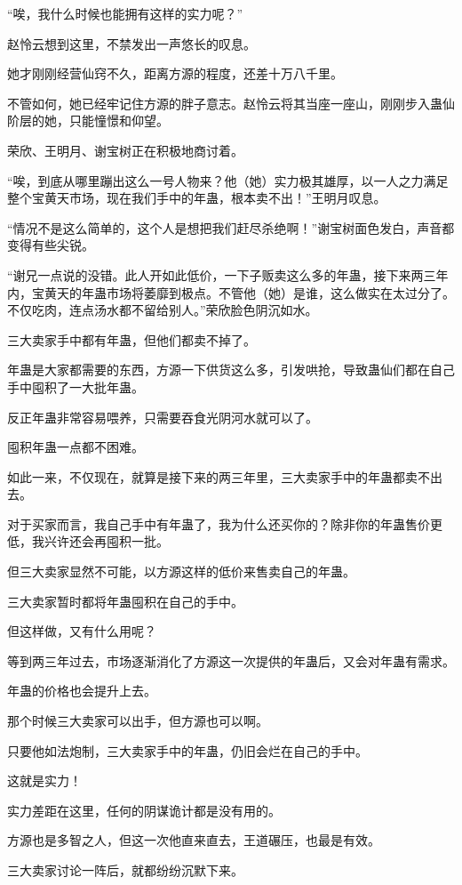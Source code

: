 \begin{this_body}
“唉，我什么时候也能拥有这样的实力呢？”

赵怜云想到这里，不禁发出一声悠长的叹息。

她才刚刚经营仙窍不久，距离方源的程度，还差十万八千里。

不管如何，她已经牢记住方源的胖子意志。赵怜云将其当座一座山，刚刚步入蛊仙阶层的她，只能憧憬和仰望。

荣欣、王明月、谢宝树正在积极地商讨着。

“唉，到底从哪里蹦出这么一号人物来？他（她）实力极其雄厚，以一人之力满足整个宝黄天市场，现在我们手中的年蛊，根本卖不出！”王明月叹息。

“情况不是这么简单的，这个人是想把我们赶尽杀绝啊！”谢宝树面色发白，声音都变得有些尖锐。

“谢兄一点说的没错。此人开如此低价，一下子贩卖这么多的年蛊，接下来两三年内，宝黄天的年蛊市场将萎靡到极点。不管他（她）是谁，这么做实在太过分了。不仅吃肉，连点汤水都不留给别人。”荣欣脸色阴沉如水。

三大卖家手中都有年蛊，但他们都卖不掉了。

年蛊是大家都需要的东西，方源一下供货这么多，引发哄抢，导致蛊仙们都在自己手中囤积了一大批年蛊。

反正年蛊非常容易喂养，只需要吞食光阴河水就可以了。

囤积年蛊一点都不困难。

如此一来，不仅现在，就算是接下来的两三年里，三大卖家手中的年蛊都卖不出去。

对于买家而言，我自己手中有年蛊了，我为什么还买你的？除非你的年蛊售价更低，我兴许还会再囤积一批。

但三大卖家显然不可能，以方源这样的低价来售卖自己的年蛊。

三大卖家暂时都将年蛊囤积在自己的手中。

但这样做，又有什么用呢？

等到两三年过去，市场逐渐消化了方源这一次提供的年蛊后，又会对年蛊有需求。

年蛊的价格也会提升上去。

那个时候三大卖家可以出手，但方源也可以啊。

只要他如法炮制，三大卖家手中的年蛊，仍旧会烂在自己的手中。

这就是实力！

实力差距在这里，任何的阴谋诡计都是没有用的。

方源也是多智之人，但这一次他直来直去，王道碾压，也最是有效。

三大卖家讨论一阵后，就都纷纷沉默下来。


\end{this_body}
